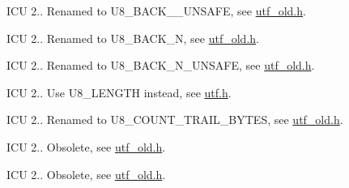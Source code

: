 \begin{DoxyRefList}
I\+CU 2.. Renamed to U8\+\_\+\+B\+A\+C\+K\+\_\+\_\+\+U\+N\+S\+A\+FE, see \mbox{\hyperlink{utf__old_8h}{utf\+\_\+old.\+h}}.  
\item[Member \mbox{\hyperlink{utf__old_8h_a699bd797aa22e9f164920f8dee916561}{U\+T\+F8\+\_\+\+B\+A\+C\+K\+\_\+\+N\+\_\+\+S\+A\+FE}} (s, start, i, n)]\label{deprecated__deprecated000125}%
%
I\+CU 2.. Renamed to U8\+\_\+\+B\+A\+C\+K\+\_\+N, see \mbox{\hyperlink{utf__old_8h}{utf\+\_\+old.\+h}}.  
\item[Member \mbox{\hyperlink{utf__old_8h_a9cb7bfec45705d514f815b87e83c67ca}{U\+T\+F8\+\_\+\+B\+A\+C\+K\+\_\+\+N\+\_\+\+U\+N\+S\+A\+FE}} (s, i, n)]\label{deprecated__deprecated000121}%
%
I\+CU 2.. Renamed to U8\+\_\+\+B\+A\+C\+K\+\_\+\+N\+\_\+\+U\+N\+S\+A\+FE, see \mbox{\hyperlink{utf__old_8h}{utf\+\_\+old.\+h}}.  
\item[Member \mbox{\hyperlink{utf__old_8h_a19b7a233154f967fad84c8113eae8b80}{U\+T\+F8\+\_\+\+C\+H\+A\+R\+\_\+\+L\+E\+N\+G\+TH}} (c)]\label{deprecated__deprecated000104}%
%
I\+CU 2.. Use U8\+\_\+\+L\+E\+N\+G\+TH instead, see \mbox{\hyperlink{utf_8h}{utf.\+h}}.  
\item[Member \mbox{\hyperlink{utf__old_8h_a017b98f7de883645ec5d623ebe7c5f1c}{U\+T\+F8\+\_\+\+C\+O\+U\+N\+T\+\_\+\+T\+R\+A\+I\+L\+\_\+\+B\+Y\+T\+ES}} (lead\+Byte)]\label{deprecated__deprecated000098}%
%
I\+CU 2.. Renamed to U8\+\_\+\+C\+O\+U\+N\+T\+\_\+\+T\+R\+A\+I\+L\+\_\+\+B\+Y\+T\+ES, see \mbox{\hyperlink{utf__old_8h}{utf\+\_\+old.\+h}}.  
\item[Member \mbox{\hyperlink{utf__old_8h_adfc391407ac7366f023ae3f0356f885c}{U\+T\+F8\+\_\+\+E\+R\+R\+O\+R\+\_\+\+V\+A\+L\+U\+E\+\_\+1}} ]\label{deprecated__deprecated000088}%
%
I\+CU 2.. Obsolete, see \mbox{\hyperlink{utf__old_8h}{utf\+\_\+old.\+h}}. 

\label{deprecated__deprecated000089}%
%
I\+CU 2.. Obsolete, see \mbox{\hyperlink{utf__old_8h}{utf\+\_\+old.\+h}}. 


\end{DoxyRefList}
